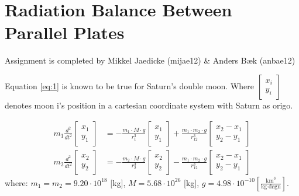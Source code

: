 \section*{Radiation Balance Between Parallel Plates}
Assignment is completed by Mikkel Jaedicke (mijae12) \& Anders Bæk (anbae12)

Equation \ref{eq:1} is known to be true for Saturn's double moon. Where $\left[ \begin{matrix} x_{ i } \\ y_{ i } \end{matrix} \right]$ denotes moon i's position in a cartesian coordinate system with Saturn as origo. 

\begin{equation}
\begin{align*}
m_{ 1 }\frac { { d }^{ 2 } }{ { dt }^{ 2 } } \left[ \begin{matrix} x_{ 1 } \\ y_{ 1 } \end{matrix} \right] &=-\frac { m_{ 1 }\cdot M\cdot g }{ { r }^{ 3 }_{ 1 } } \left[ \begin{matrix} x_{ 1 } \\ y_{ 1 } \end{matrix} \right] +\frac { m_{ 1 }\cdot m_2\cdot g }{ { r }^{ 3 }_{ 12 } } \left[ \begin{matrix} x_{ 2 }-x_{ 1 } \\ y_{ 2 }-y_{ 1 } \end{matrix} \right] \\
m_{ 2 }\frac { { d }^{ 2 } }{ { dt }^{ 2 } } \left[ \begin{matrix} x_{ 2 } \\ y_{ 2 } \end{matrix} \right] &=-\frac { m_{ 2 }\cdot M\cdot g }{ { r }^{ 3 }_{ 2 } } \left[ \begin{matrix} x_{ 2 } \\ y_{ 2 } \end{matrix} \right] -\frac { m_{ 1 }\cdot m_{ 2 }\cdot g }{ { r }^{ 3 }_{ 12 } } \left[ \begin{matrix} x_{ 2 }-x_{ 1 } \\ y_{ 2 }-y_{ 1 } \end{matrix} \right] 
\end{align*}
\label{eq:1}
\end{equation}
where: \( m_1 = m_2 =9.20 \cdot 10^{18} \) [kg], \( M = 5.68  \cdot 10^{26} \) [kg], \( g = 4.98 \cdot 10^{-10} \left[ \frac { \text{km}^3 }{ \text{kg} \cdot \text{døgn} }  \right] \).

